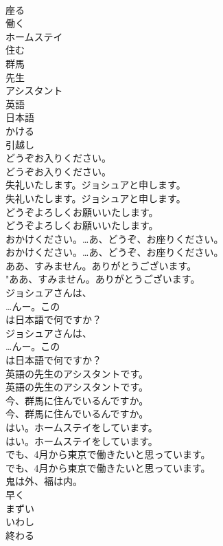 \documentclass[8pt]{extreport}
\begin{document}
\begin{CJK}{UTF8}{min}
\\	座る
\\	働く
\\	ホームステイ
\\	住む
\\	群馬
\\	先生
\\	アシスタント
\\	英語
\\	日本語
\\	かける
\\	引越し
\\	どうぞお入りください。	
\\	どうぞお入りください。 
\\	失礼いたします。ジョシュアと申します。	
\\	失礼いたします。ジョシュアと申します。 
\\	どうぞよろしくお願いいたします。	
\\	どうぞよろしくお願いいたします。 
\\	おかけください。…あ、どうぞ、お座りください。	
\\	おかけください。…あ、どうぞ、お座りください。 
\\	ああ、すみません。ありがとうございます。	
\\	"ああ、すみません。ありがとうございます。 
\\	ジョシュアさんは、
\\	…んー。この
\\	は日本語で何ですか？	
\\	ジョシュアさんは、
\\	…んー。この
\\	は日本語で何ですか？ 
\\	英語の先生のアシスタントです。	
\\	英語の先生のアシスタントです。 
\\	今、群馬に住んでいるんですか。	
\\	今、群馬に住んでいるんですか。 
\\	はい。ホームステイをしています。	
\\	はい。ホームステイをしています。 
\\	でも、4月から東京で働きたいと思っています。	
\\	でも、4月から東京で働きたいと思っています。 
\\	鬼は外、福は内。
\\	早く
\\	まずい
\\	いわし
\\	終わる

\end{CJK}
\end{document}
